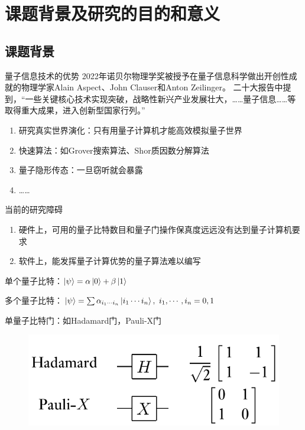 \documentclass[fontset=windows,toc=true,type=bachelor,stage=opening,campus=weihai]{hithesisart}
\begin{document}

\makecover

\section{课题背景及研究的目的和意义}
\subsection{课题背景}
量子信息技术的优势
2022年诺贝尔物理学奖被授予在量子信息科学做出开创性成就的物理学家Alain Aspect、John Clauser和Anton Zeilinger。
二十大报告中提到，“一些关键核心技术实现突破，战略性新兴产业发展壮大，……量子信息……等取得重大成果，进入创新型国家行列。”
\begin{enumerate}
\item 研究真实世界演化：只有用量子计算机才能高效模拟量子世界\cite{1999Simulating}%
\item 快速算法：如Grover搜索算法、Shor质因数分解算法
\item 量子隐形传态：一旦窃听就会暴露
\item ……
\end{enumerate}
当前的研究障碍
\begin{enumerate}
\item 硬件上，可用的量子比特数目和量子门操作保真度远远没有达到量子计算机要求
\item 软件上，能发挥量子计算优势的量子算法难以编写
\end{enumerate}

单个量子比特：$ \ket{\psi}=\alpha\ket{0}+\beta\ket{1} $

多个量子比特：$ \ket{\psi}=\sum\alpha_{i_1\cdots i_n}\ket{i_1\cdots i_n},~i_1,\cdots,i_n=0,1 $

单量子比特门：如Hadamard门，Pauli-X门
\begin{figure}
\centering
\includegraphics[scale=0.25]{gate1}
\label{fig:gate1}
\end{figure}
\end{document}
